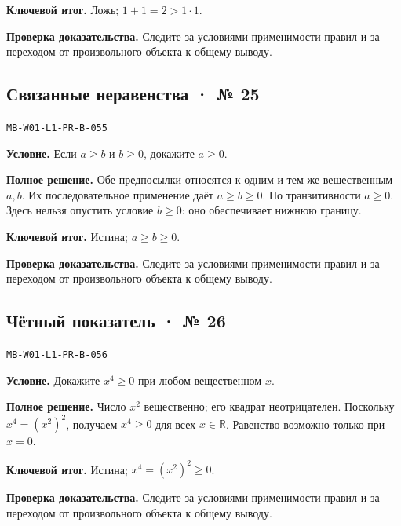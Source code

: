 \documentclass[11pt,a4paper,openany]{book}
\newcommand{\muid}[1]{\texttt{\footnotesize #1}}
\begin{document}
\begin{learnbox}\textbf{Ключевой итог.} Ложь; $1+1=2>1\cdot1$.\par \textbf{Проверка доказательства.} 
Следите за условиями применимости правил и за переходом от произвольного объекта к общему выводу. 
\end{learnbox}

\subsection*{Связанные неравенства · № 25}\hypertarget{solution:MB-W01-L1-PR-B-055}{}

\muid{MB-W01-L1-PR-B-055}\par

\textbf{Условие.} Если $a\ge b$ и $b\ge0$, докажите $a\ge0$.\par

\textbf{Полное решение.} Обе предпосылки относятся к одним и тем же вещественным $a,b$. Их последовательное применение даёт $a\ge b\ge0$. По транзитивности $a\ge0$. Здесь нельзя опустить условие $b\ge0$: оно обеспечивает нижнюю границу.


\begin{learnbox}\textbf{Ключевой итог.} Истина; $a\ge b\ge0$.\par \textbf{Проверка доказательства.} 
Следите за условиями применимости правил и за переходом от произвольного объекта к общему выводу. 
\end{learnbox}

\subsection*{Чётный показатель · № 26}\hypertarget{solution:MB-W01-L1-PR-B-056}{}

\muid{MB-W01-L1-PR-B-056}\par

\textbf{Условие.} Докажите $x^4\ge0$ при любом вещественном $x$.\par

\textbf{Полное решение.} Число $x^2$ вещественно; его квадрат неотрицателен. Поскольку $x^4=(x^2)^2$, получаем $x^4\ge0$ для всех $x\in\mathbb R$. Равенство возможно только при $x=0$.


\begin{learnbox}\textbf{Ключевой итог.} Истина; $x^4=(x^2)^2\ge0$.\par \textbf{Проверка доказательства.} 
Следите за условиями применимости правил и за переходом от произвольного объекта к общему выводу. 
\end{learnbox}
\end{document}
